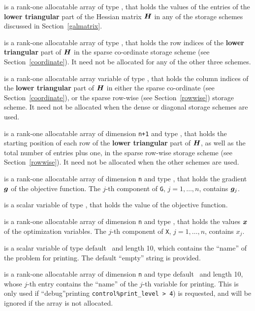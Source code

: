 \documentclass{galahad}
\begin{document}
\begin{description}
\begin{description}
 is a rank-one allocatable array of type \realdp, that holds
the values of the entries of the {\bf lower triangular} part
of the Hessian matrix ${\bm{H}}$ in any of the
storage schemes discussed in Section~\ref{galmatrix}.

 is a rank-one allocatable array of type \integer,
that holds the row indices of the {\bf lower triangular} part of ${\bm{H}}$
in the sparse co-ordinate storage
scheme (see Section~\ref{coordinate}).
It need not be allocated for any of the other three schemes.

 is a rank-one allocatable array variable of type \integer,
that holds the column indices of the {\bf lower triangular} part of
${\bm{H}}$ in either the sparse co-ordinate
(see Section~\ref{coordinate}), or the sparse row-wise
(see Section~\ref{rowwise}) storage scheme.
It need not be allocated when the dense or diagonal storage schemes are used.

 is a rank-one allocatable array of dimension {\tt n+1} and type
\integer, that holds the starting position of
each row of the {\bf lower triangular} part of ${\bm{H}}$, as well
as the total number of entries plus one, in the sparse row-wise storage
scheme (see Section~\ref{rowwise}). It need not be allocated when the
other schemes are used.

\end{description}

 is a rank-one allocatable array of dimension {\tt n} and type
\realdp, that holds the gradient ${\bm{g}}$
of the objective function.
The $j$-th component of
{\tt G}, $j = 1,  \ldots ,  n$, contains ${\bm{g}}_{j}$.

 is a scalar variable of type
\realdp, that holds the value of the objective function.

 is a rank-one allocatable array of dimension {\tt n} and type
\realdp,
that holds the values ${\bm{x}}$ of the optimization variables.
The $j$-th component of {\tt X}, $j = 1,  \ldots , n$, contains $x_{j}$.

 is a scalar variable of type
default \character\ and length 10, which contains the
``name'' of the problem for printing. The default ``empty'' string is
provided.

 is a rank-one allocatable array of dimension {\tt n} and type
default \character\ and length 10, whose $j$-th entry contains the
``name'' of the $j$-th variable for printing. This is only used
if ``debug''printing {\tt control\%print\_level > 4}) is requested,
and will be ignored if the array is not allocated.

\end{description}
\end{document}
